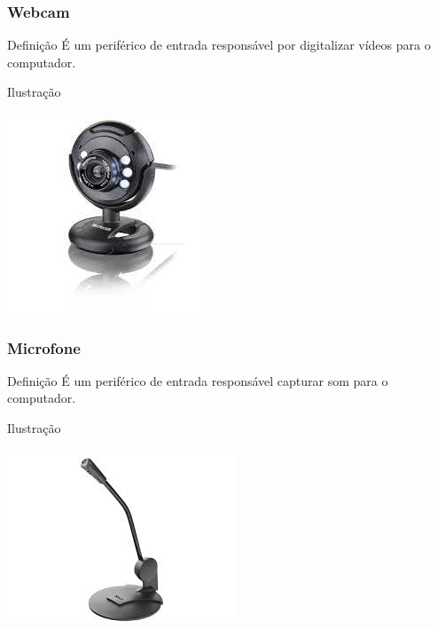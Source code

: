 \documentclass[aspectratio=169]{beamer} %
\begin{document}
\begin{frame}
	\frametitle{Webcam}
	
	\begin{block}{Defini\c cão}
		É um periférico de entrada responsável por digitalizar vídeos para o computador.
	\end{block}\vfill
	
	\begin{exampleblock}{Ilustra\c cão}
		\begin{center}
			\includegraphics[scale=0.4]{img/webcam}
		\end{center}				
	\end{exampleblock}
\end{frame}

\begin{frame}
	\frametitle{Microfone}
	
	\begin{block}{Defini\c cão}
		É um periférico de entrada responsável capturar som para o computador.
	\end{block}\vfill
	
	\begin{exampleblock}{Ilustra\c cão}
		\begin{center}
			\includegraphics[scale=0.4]{img/microfone}
		\end{center}				
	\end{exampleblock}
\end{frame}
\end{document}
